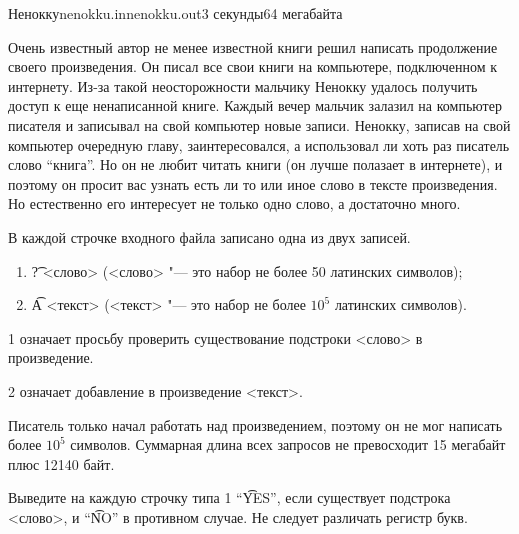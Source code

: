 \begin{problem}{Ненокку}{nenokku.in}{nenokku.out}{3 секунды}{64 мегабайта}

Очень известный автор не менее известной книги решил написать 
продолжение своего произведения. 
Он писал все свои книги на компьютере, подключенном к интернету. 
Из-за такой неосторожности мальчику Ненокку удалось получить доступ к еще ненаписанной книге. 
Каждый вечер мальчик залазил на компьютер писателя и записывал на свой компьютер 
новые записи. Ненокку, записав на свой компьютер очередную главу, 
заинтересовался, а использовал ли хоть раз писатель слово ``книга''. 
Но он не любит читать книги (он лучше полазает в интернете), и поэтому 
он просит вас узнать есть ли то или иное слово в тексте произведения. 
Но естественно его интересует не только одно слово, а достаточно много.

\InputFile

В каждой строчке входного файла записано одна из двух записей.

\begin{enumerate}
\item \t{? <слово>} (<слово> "--- это набор не более 50 латинских символов);

\item \t{A <текст>} (<текст> "--- это набор не более $10^5$ латинских символов).
\end{enumerate}

1 означает просьбу проверить существование подстроки <слово> в произведение.

2 означает добавление в произведение <текст>.

Писатель только начал работать над произведением, поэтому он не мог 
написать более $10^5$ символов. Суммарная длина всех запросов
не превосходит 15 мегабайт плюс 12140 байт.

\OutputFile

Выведите на каждую строчку типа 1 ``\t{YES}'', если существует 
подстрока <слово>, и ``\t{NO}'' в противном случае. Не следует 
различать регистр букв.

\Example

\begin{example}%
%
\end{example}

\end{problem}
